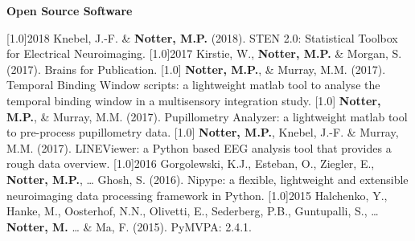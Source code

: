 \documentclass[english]{cv-style}
\begin{document}
\large\textbf{Open Source Software}\normalsize

\begin{publist}
\publications
  {\scalebox{.8}[1.0]{2018}}
  {Knebel, J.-F. \& \textbf{Notter, M.P.} (2018). STEN 2.0: Statistical Toolbox for Electrical Neuroimaging. \color{gray}}
\publications
  {\scalebox{.8}[1.0]{2017}}
  {Kirstie, W., \textbf{Notter, M.P.} \& Morgan, S. (2017). Brains for Publication. \color{gray}}
\publications
  {\scalebox{.8}[1.0]{}}
  {\textbf{Notter, M.P.}, \& Murray, M.M. (2017). Temporal Binding Window scripts: a lightweight matlab tool to analyse the temporal binding window in a multisensory integration study. \color{gray}}
\publications
  {\scalebox{.8}[1.0]{}}
  {\textbf{Notter, M.P.}, \& Murray, M.M. (2017). Pupillometry Analyzer: a lightweight matlab tool to pre-process pupillometry data. \color{gray}}
\publications
  {\scalebox{.8}[1.0]{}}
  {\textbf{Notter, M.P.}, Knebel, J.-F. \& Murray, M.M. (2017). LINEViewer: a Python based EEG analysis tool that provides a rough data overview. \color{gray}}
\publications
  {\scalebox{.8}[1.0]{2016}}
  {Gorgolewski, K.J., Esteban, O., Ziegler, E., \textbf{Notter, M.P.}, … Ghosh, S. (2016). Nipype: a flexible, lightweight and extensible neuroimaging data processing framework in Python. \color{gray}}
\publications
  {\scalebox{.8}[1.0]{2015}}
  {Halchenko, Y., Hanke, M., Oosterhof, N.N., Olivetti, E., Sederberg, P.B., Guntupalli, S., … \textbf{Notter, M.} … \& Ma, F. (2015). PyMVPA: 2.4.1. \color{gray}}
\end{publist}

\newpage

\end{document}
